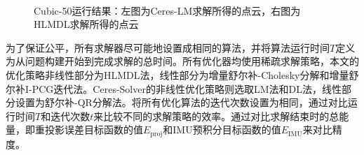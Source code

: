 \begin{figure}[htb!]
    \centering
    ~
    \caption{Cubic-50运行结果：左图为Ceres-LM求解所得的点云，右图为HLMDL求解所得的点云}
    \label{fig:cubic}
\end{figure}

为了保证公平，所有求解器尽可能地设置成相同的算法，并将算法运行时间$T$定义为从问题构建开始到完成求解的总时间。所有优化器均使用稀疏求解策略，本文的优化策略非线性部分为HLMDL法，线性部分为增量舒尔补-Cholesky分解和增量舒尔补I-PCG迭代法。Ceres-Solver的非线性优化策略则选取LM法和DL法，线性部分设置为舒尔补-QR分解法。将所有优化算法的迭代次数设置为相同，通过对比运行时间$T$和迭代次数$t$来比较不同的求解策略的效率。通过对比求解结束时的总能量，即重投影误差目标函数的值$E_{\text{proj}}$和IMU预积分目标函数的值$E_{\text{IMU}}$来对比精度。

